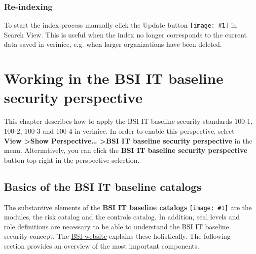 \documentclass[a4paper,10pt]{book}
\newcommand{\icon}[1]{\texttt{[image: \#1]}}
\begin{document}
\subsection{Re-indexing}
\label{sec:reindexing}

To start the index process manually click the Update
button \icon{Icon/Aktualisieren.png} in Search
View. This is useful when the index no longer corresponds to the
current data saved in verinice, e.g. when larger organizations have
been deleted.



\chapter{Working in the BSI IT baseline security perspective} \label{Working in the BSI IT baseline security perspective}
This chapter describes how to apply the BSI IT baseline security standards
100-1, 100-2, 100-3 and 100-4 in verinice.  In order to enable this
perspective, select \textbf{View \textgreater Show Perspective\ldots
\textgreater BSI IT baseline security perspective} in the menu. Alternatively,
you can click the \textbf{BSI IT baseline security perspective} button top
right in the perspective selection.

\section{Basics of the BSI IT baseline catalogs}
The substantive elements of the \textbf{BSI IT baseline catalogs} \icon{Icon/GS_Kataloge.png}
are the modules, the risk catalog and the controls catalog. In addition, seal levels and role definitions are necessary
to be able to understand the BSI IT baseline security concept.
The \href{https://www.bsi.bund.de/cln_156/DE/Themen/weitereThemen/ITGrundschutzKataloge/itgrundschutzkataloge_node.html}{BSI website}
explains these holistically. The following section provides an overview of the most important components.
\end{document}
